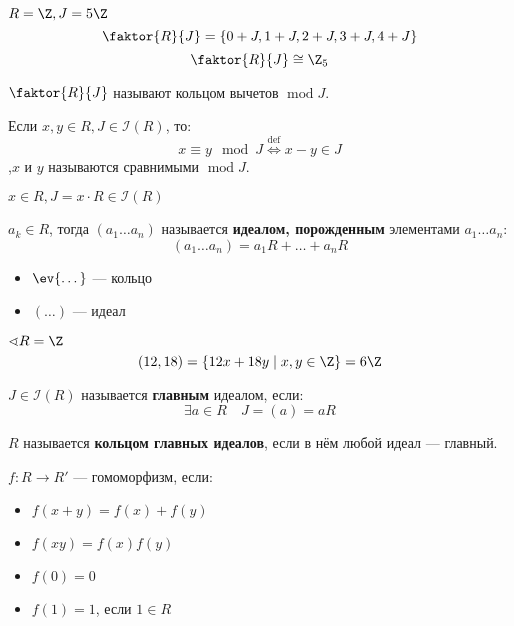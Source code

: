 \begin{example}
    \(R = \Z, J = 5\Z\)
    \[\faktor{R}{J} = \{0 + J, 1 + J, 2 + J, 3 + J, 4 + J\}\]
    \[\faktor{R}{J} \cong \Z_5\]
\end{example}

\begin{remark}
    \(\faktor{R}{J}\) называют кольцом вычетов \(\operatorname{mod} J\).
\end{remark}

\begin{definition}
    Если \(x, y \in R, J \in \mathcal{I}(R)\), то:
    \[x \equiv y \mod J \stackrel{\mathrm{def}}{\Leftrightarrow} x - y \in J\]
    ,\(x\) и \(y\) называются сравнимыми \(\operatorname{mod} J\).
\end{definition}

\begin{remark}
    \(x \in R, J = x \cdot R \in \mathcal{I}(R)\)
\end{remark}

\begin{definition}
    \(a_k \in R\), тогда \((a_1 \dots a_n)\) называется \textbf{идеалом, порожденным} элементами \(a_1 \dots a_n\):
    \[(a_1 \dots a_n) = a_1R + \dots + a_nR\]
\end{definition}
\begin{remark}\itemfix
    \begin{itemize}
        \item \(\ev{\dots}\) --- кольцо
        \item \((\ldots)\) --- идеал
    \end{itemize}
\end{remark}

\begin{example}
    \(\sphericalangle R = \Z\)
    \[(12, 18) = \{12x + 18y \mid x, y \in \Z\} = 6\Z\]
\end{example}

\begin{definition}
    \(J \in \mathcal{I}(R)\) называется \textbf{главным} идеалом, если:
    \[\exists a \in R \quad J = (a) = aR\]
\end{definition}

\begin{definition}
    \(R\) называется \textbf{кольцом главных идеалов}, если в нём любой идеал --- главный.
\end{definition}

\begin{definition}
    \(f : R \to R'\) --- гомоморфизм, если:
    \begin{itemize}
        \item \(f(x + y) = f(x) + f(y)\)
        \item \(f(xy) = f(x)f(y)\)
        \item \(f(0) = 0\)
        \item \(f(1) = 1\), если \(1 \in R\)
    \end{itemize}
\end{definition}

